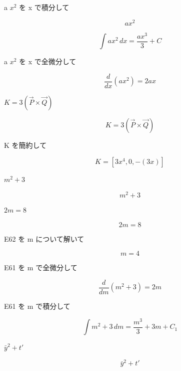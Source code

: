 \documentclass[dvipdfmx,a4paper,11pt]{jsarticle}
\begin{document}
a $x^2$ を x で積分して

\begin{equation}
  a x^2
  \label{eq:E56}
\end{equation}

\begin{equation}
  \int a x^2 \, dx = \frac{a x^3}{3} + C
  \label{eq:E57}
\end{equation}

a $x^2$ を x で全微分して

\begin{equation}
  \frac{d}{dx}\left(a x^2\right) = 2 a x
  \label{eq:E58}
\end{equation}

$K = 3 (\vec{P} \times \vec{Q})$

\begin{equation}
  K = 3 (\vec{P} \times \vec{Q})
  \label{eq:E59}
\end{equation}

K を簡約して

\begin{equation}
  K = \left[ 3 x^4 , 0 , -\left(3 x\right) \right]
  \label{eq:E60}
\end{equation}

$m^2 + 3$

\begin{equation}
  m^2 + 3
  \label{eq:E61}
\end{equation}

$2 m = 8$

\begin{equation}
  2 m = 8
  \label{eq:E62}
\end{equation}

E62 を m について解いて

\begin{equation}
  m = 4
  \label{eq:E63}
\end{equation}

E61 を m で全微分して

\begin{equation}
  \frac{d}{dm}\left(m^2 + 3\right) = 2 m
  \label{eq:E64}
\end{equation}

E61 を m で積分して

\begin{equation}
  \int m^2 + 3 \, dm = \frac{m^3}{3}+3 m + C_1
  \label{eq:E65}
\end{equation}

$\bar{y}^2 + t'$

\begin{equation}
  \bar{y}^2 + t'
  \label{eq:E66}
\end{equation}
\end{document}

